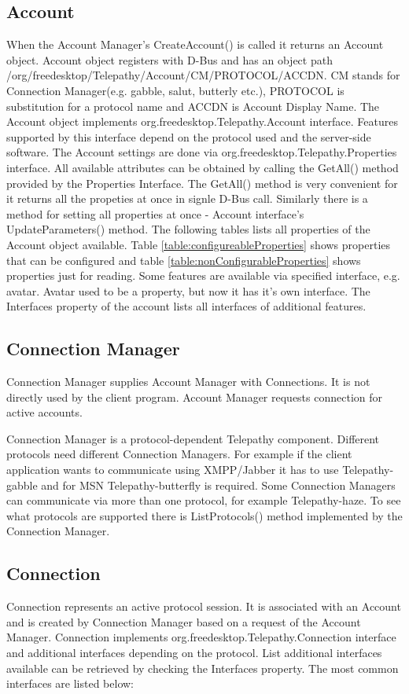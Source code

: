 \subsection*{Account}
When the Account Manager's CreateAccount() is called it returns an Account object. Account object registers with D-Bus and has an object path /org/freedesktop/Telepathy/Account/CM/PROTOCOL/ACCDN. CM stands for Connection Manager(e.g. gabble, salut, butterly etc.), PROTOCOL is substitution for a protocol name and ACCDN is Account Display Name. The Account object implements org.freedesktop.Telepathy.Account interface. Features supported by this interface depend on the protocol used and the server-side software. The Account settings are done via org.freedesktop.Telepathy.Properties interface. All available attributes can be obtained by calling the GetAll() method provided by the Properties Interface. The GetAll() method is very convenient for it returns all the propeties at once in signle D-Bus call. Similarly there is a method for setting all properties at once - Account interface's UpdateParameters() method. The following tables lists all properties of the Account object available. Table \ref{table:configureableProperties} shows properties that can be configured and table \ref{table:nonConfigurableProperties} shows properties just for reading. Some features are available via specified interface, e.g. avatar. Avatar used to be a property, but now it has it's own interface. The Interfaces property of the account lists all interfaces of additional features.\cite{TPWiki}

\subsection*{Connection Manager}
Connection Manager supplies Account Manager with Connections. It is not directly used by the client program. Account Manager requests connection for active accounts.

Connection Manager is a protocol-dependent Telepathy component. Different protocols need different Connection Managers. For example if the client application wants to communicate using XMPP/Jabber it has to use Telepathy-gabble and for MSN Telepathy-butterfly is required. Some Connection Managers can communicate via more than one protocol, for example Telepathy-haze. To see what protocols are supported there is ListProtocols() method implemented by the Connection Manager.\cite{TPWiki}

\subsection*{Connection}
Connection represents an active protocol session. It is associated with an Account and is created by Connection Manager based on a request of the Account Manager. Connection implements org.freedesktop.Telepathy.Connection interface and additional interfaces depending on the protocol. List additional interfaces available can be retrieved by checking the Interfaces property. The most common interfaces are listed below\cite{TPWiki}:

